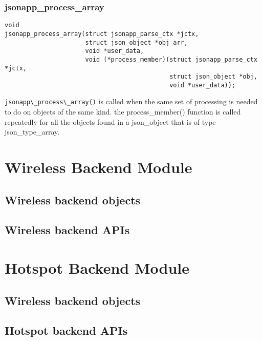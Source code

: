 \documentclass{article}
\begin{document}
\subsubsection{jsonapp\_process\_array}
\begin{lstlisting}
void 
jsonapp_process_array(struct jsonapp_parse_ctx *jctx,
                      struct json_object *obj_arr,
                      void *user_data,
                      void (*process_member)(struct jsonapp_parse_ctx *jctx,
                                             struct json_object *obj,
                                             void *user_data));
\end{lstlisting}
\verb|jsonapp\_process\_array()| is called when the same set of processing is needed 
to do on objects of the same kind. the process\_member() function is called repeatedly
for all the objects found in a json\_object that is of type json\_type\_array.

\section{Wireless Backend Module}
\subsection{Wireless backend objects}
\subsection{Wireless backend APIs}


\section{Hotspot Backend Module}
\subsection{Wireless backend objects}
\subsection{Hotspot backend APIs}

	
\end{document}
